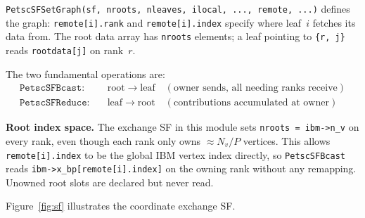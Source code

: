 \documentclass[11pt]{article}
\begin{document}
\texttt{PetscSFSetGraph(sf, nroots, nleaves, ilocal, ..., remote, ...)} defines the
graph: \texttt{remote[i].rank} and \texttt{remote[i].index} specify where leaf~$i$
fetches its data from.  The root data array has \texttt{nroots} elements; a leaf
pointing to \texttt{\{r, j\}} reads \texttt{rootdata[j]} on rank~$r$.

The two fundamental operations are:
\begin{align*}
\texttt{PetscSFBcast}:& \quad \text{root} \to \text{leaf}
  \quad (\text{owner sends, all needing ranks receive}) \\
\texttt{PetscSFReduce}:& \quad \text{leaf} \to \text{root}
  \quad (\text{contributions accumulated at owner})
\end{align*}

\textbf{Root index space.}
The exchange SF in this module sets \texttt{nroots = ibm->n\_v} on every rank,
even though each rank only owns $\approx N_v / P$ vertices.  This allows
\texttt{remote[i].index} to be the global IBM vertex index directly, so
\texttt{PetscSFBcast} reads \texttt{ibm->x\_bp[remote[i].index]} on the owning rank
without any remapping.  Unowned root slots are declared but never read.

Figure~\ref{fig:sf} illustrates the coordinate exchange SF.
\end{document}
